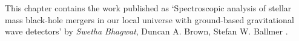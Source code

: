 This chapter contains the work published as `Spectroscopic analysis of stellar mass black-hole mergers in our local universe with ground-based gravitational wave detectors' by \textit{Swetha Bhagwat}, Duncan A. Brown, Stefan W. Ballmer \cite{MySpectroscopy}.






